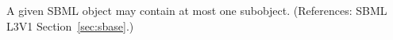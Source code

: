 A given SBML object may contain at most one \Notes subobject.  (References:
SBML L3V1 Section~\ref{sec:sbase}.)

